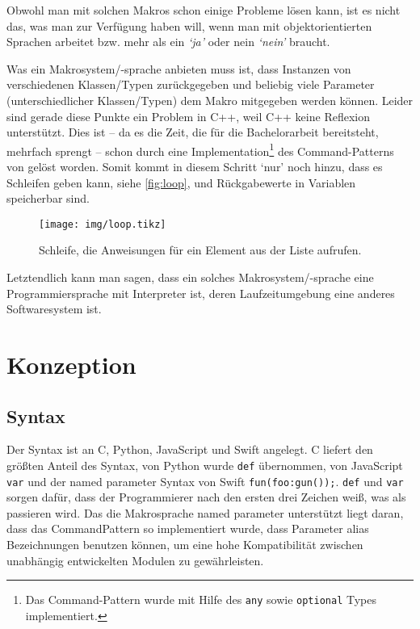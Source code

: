     Obwohl man mit solchen Makros schon einige Probleme lösen kann, ist es nicht das, was man zur Verfügung haben will, wenn man mit objektorientierten Sprachen arbeitet bzw. mehr als ein \textit{`ja'} oder nein \textit{`nein'} braucht.

    Was ein Makrosystem/-sprache anbieten muss ist, dass Instanzen von verschiedenen Klassen/Typen zurückgegeben und beliebig viele Parameter (unterschiedlicher Klassen/Typen) dem Makro mitgegeben werden können. Leider sind gerade diese Punkte ein Problem in C++, weil C++ keine Reflexion\autocites{vinoski2005time}{ferber1989computational} unterstützt. Dies ist -- da es die Zeit, die für die Bachelorarbeit bereitsteht, mehrfach sprengt -- schon durch eine Implementation\footnote{%
      Das Command-Pattern wurde mit Hilfe des \texttt{any}
      sowie \texttt{optional}
      Types implementiert.
    }\spewnotes{}
    des Command-Patterns von gelöst worden. Somit kommt in diesem Schritt `nur' noch hinzu, dass es Schleifen geben kann, siehe \autoref{fig:loop}, und Rückgabewerte in Variablen speicherbar sind.

    \begin{figure}[H]
      \centering
      \texttt{[image: img/loop.tikz]}
      \caption{Schleife, die Anweisungen für ein Element aus der Liste aufrufen.}
      \label{fig:loop}
    \end{figure}

    Letztendlich kann man sagen, dass ein solches Makrosystem/-sprache eine Programmiersprache mit Interpreter ist, deren Laufzeitumgebung eine anderes Softwaresystem ist.

\section{Konzeption}
\label{sec:Konzeption}
  \subsection{Syntax}
  \label{ssec:Syntax}
    Der Syntax ist an C, Python, JavaScript und Swift angelegt. C liefert den größten Anteil des Syntax, von Python wurde \lstinline[style=MyMacroStyle]$def$ übernommen, von JavaScript \lstinline[style=MyMacroStyle]$var$ und der named parameter Syntax von Swift \lstinline[style=MyMacroStyle]$fun(foo:gun());$.  \lstinline[style=MyMacroStyle]$def$ und \lstinline[style=MyMacroStyle]$var$ sorgen dafür, dass der Programmierer nach den ersten drei Zeichen weiß, was als passieren wird. Das die Makrosprache named parameter unterstützt liegt daran, dass das CommandPattern so implementiert wurde, dass Parameter alias Bezeichnungen benutzen können, um eine hohe Kompatibilität zwischen unabhängig entwickelten Modulen zu gewährleisten.

